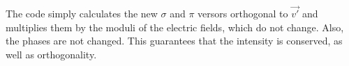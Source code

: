 \documentclass{iucr}
\newcommand{\todo}[1]{{\color{red}[TODO: "#1'']}}
\begin{document}





The code simply calculates the new $\sigma$ and $\pi$ versors orthogonal to $\vec{v'}$ and multiplies them by the moduli of the electric fields, which do not change. 
Also, the phases are not changed. 
This guarantees that the intensity is conserved, as well as orthogonality.




\end{document}
